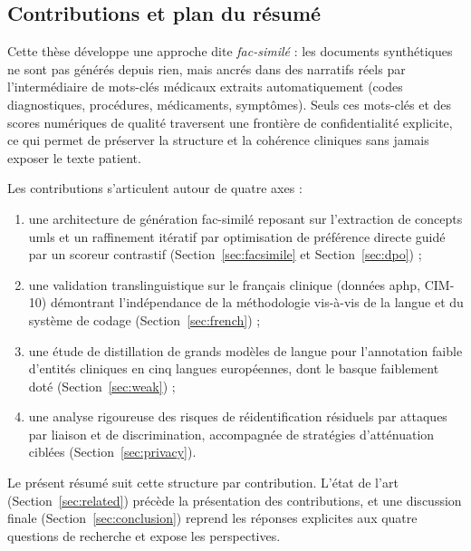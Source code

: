 \subsection{Contributions et plan du résumé}

Cette thèse développe une approche dite \textit{fac-similé} : les documents synthétiques ne
sont pas générés depuis rien, mais ancrés dans des narratifs réels par l'intermédiaire de
mots-clés médicaux extraits automatiquement (codes diagnostiques, procédures, médicaments,
symptômes). Seuls ces mots-clés et des scores numériques de qualité traversent une
frontière de confidentialité explicite, ce qui permet de préserver la structure et la cohérence
cliniques sans jamais exposer le texte patient.

Les contributions s'articulent autour de quatre axes :
\begin{enumerate}
  \item une architecture de génération fac-similé reposant sur l'extraction de concepts
    \gls{umls} et un raffinement itératif par optimisation de préférence directe guidé par un
    scoreur contrastif (Section~\ref{sec:facsimile} et Section~\ref{sec:dpo}) ;
  \item une validation translinguistique sur le français clinique (données \gls{aphp}, CIM-10)
    démontrant l'indépendance de la méthodologie vis-à-vis de la langue et du système de
    codage (Section~\ref{sec:french}) ;
  \item une étude de distillation de grands modèles de langue pour l'annotation faible
    d'entités cliniques en cinq langues européennes, dont le basque faiblement doté
    (Section~\ref{sec:weak}) ;
  \item une analyse rigoureuse des risques de réidentification résiduels par attaques par
    liaison et de discrimination, accompagnée de stratégies d'atténuation ciblées
    (Section~\ref{sec:privacy}).
\end{enumerate}

Le présent résumé suit cette structure par contribution. L'état de l'art
(Section~\ref{sec:related}) précède la présentation des contributions, et une discussion
finale (Section~\ref{sec:conclusion}) reprend les réponses explicites aux quatre questions
de recherche et expose les perspectives.
